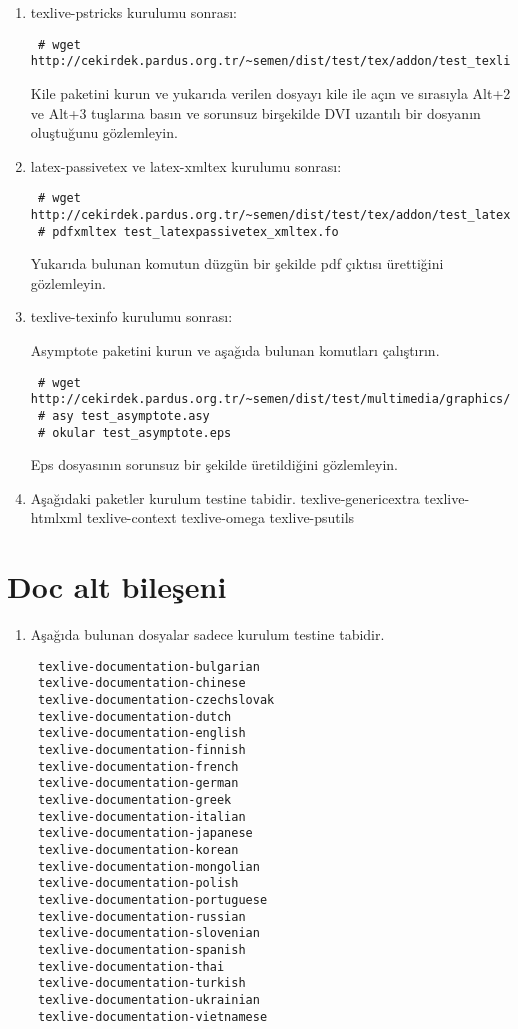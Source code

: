 \documentclass[a4paper,10pt]{article}
\begin{document}
\begin{enumerate}
\item texlive-pstricks kurulumu sonrası:
\begin{verbatim}
 # wget http://cekirdek.pardus.org.tr/~semen/dist/test/tex/addon/test_texlivepstricks.tex
\end{verbatim}

Kile paketini kurun ve yukarıda verilen dosyayı kile ile açın ve sırasıyla Alt+2 ve Alt+3 tuşlarına basın ve sorunsuz birşekilde DVI uzantılı bir dosyanın oluştuğunu gözlemleyin.
\item  latex-passivetex ve latex-xmltex kurulumu sonrası:
\begin{verbatim}
 # wget http://cekirdek.pardus.org.tr/~semen/dist/test/tex/addon/test_latexpassivetex_xmltex.fo
 # pdfxmltex test_latexpassivetex_xmltex.fo
\end{verbatim}

Yukarıda bulunan komutun düzgün bir şekilde pdf çıktısı ürettiğini gözlemleyin.

\item texlive-texinfo kurulumu sonrası:

Asymptote paketini kurun ve aşağıda bulunan komutları çalıştırın.
\begin{verbatim}
 # wget http://cekirdek.pardus.org.tr/~semen/dist/test/multimedia/graphics/test_asymptote.asy
 # asy test_asymptote.asy
 # okular test_asymptote.eps
\end{verbatim}

Eps dosyasının sorunsuz bir şekilde üretildiğini gözlemleyin.

\item Aşağıdaki paketler kurulum testine tabidir.
texlive-genericextra
texlive-htmlxml
texlive-context
texlive-omega
texlive-psutils
\end{enumerate}
\section{Doc alt bileşeni} 
\begin{enumerate}
\item  Aşağıda bulunan dosyalar sadece kurulum testine tabidir.

\begin{verbatim}
 texlive-documentation-bulgarian
 texlive-documentation-chinese
 texlive-documentation-czechslovak
 texlive-documentation-dutch
 texlive-documentation-english
 texlive-documentation-finnish
 texlive-documentation-french
 texlive-documentation-german
 texlive-documentation-greek
 texlive-documentation-italian
 texlive-documentation-japanese
 texlive-documentation-korean
 texlive-documentation-mongolian
 texlive-documentation-polish
 texlive-documentation-portuguese
 texlive-documentation-russian
 texlive-documentation-slovenian
 texlive-documentation-spanish
 texlive-documentation-thai
 texlive-documentation-turkish
 texlive-documentation-ukrainian
 texlive-documentation-vietnamese
\end{verbatim}

\end{enumerate}
\end{document}

